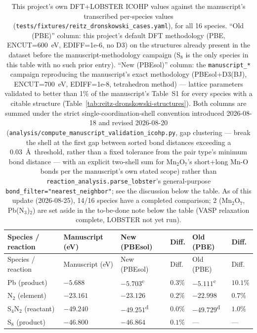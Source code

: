 {\small
\begin{longtable}{@{}p{2.4cm}*{5}{>{\raggedleft\arraybackslash}p{1.9cm}}@{}}
\caption{This project's own DFT+LOBSTER ICOHP values against the manuscript's transcribed per-species values (\texttt{tests/fixtures/reitz\_dronskowski\_cases.yaml}), for all 16 species. ``Old (PBE)'' column: this project's default DFT methodology (PBE, ENCUT=600~eV, EDIFF=1e-6, no D3) on the structures already present in the dataset before the manuscript-methodology campaign (S$_8$ is the only species in this table with no such prior entry). ``New (PBEsol)'' column: the \texttt{manuscript\_*} campaign reproducing the manuscript's exact methodology (PBEsol+D3(BJ), ENCUT=700~eV, EDIFF=1e-8, tetrahedron method) --- lattice parameters validated to better than 1\% of the manuscript's Table~S1 for every species with a citable structure (Table~\ref{tab:reitz-dronskowski-structures}). Both columns are summed under the strict single-coordination-shell convention introduced 2026-08-18 and revised 2026-08-20 (\texttt{analysis/compute\_manuscript\_validation\_icohp.py}, gap clustering --- break the shell at the first gap between sorted bond distances exceeding a 0.03~\AA\ threshold, rather than a fixed tolerance from the pair type's minimum bond distance --- with an explicit two-shell sum for Mn$_2$O$_7$'s short+long Mn-O bonds per the manuscript's own stated scope) rather than \texttt{reaction\_analysis.parse\_lobster}'s general-purpose \texttt{bond\_filter="nearest\_neighbor"}; see the discussion below the table. As of this update (2026-08-25), 14/16 species have a completed comparison; 2 (Mn$_2$O$_7$, Pb(N$_3$)$_2$) are set aside in the to-be-done note below the table (VASP relaxation complete, LOBSTER not yet run).}
\label{tab:reitz-dronskowski-dft}\\
\toprule
Species / reaction & Manuscript (eV) & New (PBEsol) & Diff. & Old (PBE) & Diff. \\
\midrule
\endfirsthead
\toprule
Species / reaction & Manuscript (eV) & New (PBEsol) & Diff. & Old (PBE) & Diff. \\
\midrule
\endhead
\bottomrule
\endfoot
Pb (product) & $-5.688$ & $-5.703$\textsuperscript{c} & $0.3\%$ & $-5.111$\textsuperscript{c} & $10.1\%$ \\
N$_2$ (element) & $-23.161$ & $-23.126$ & $0.2\%$ & $-22.998$ & $0.7\%$ \\
S$_4$N$_2$ (reactant) & $-49.240$ & $-49.251$\textsuperscript{d} & $0.0\%$ & $-49.729$\textsuperscript{d} & $1.0\%$ \\
S$_8$ (product) & $-46.800$ & $-46.864$ & $0.1\%$ & --- & --- \\

\end{longtable}}
